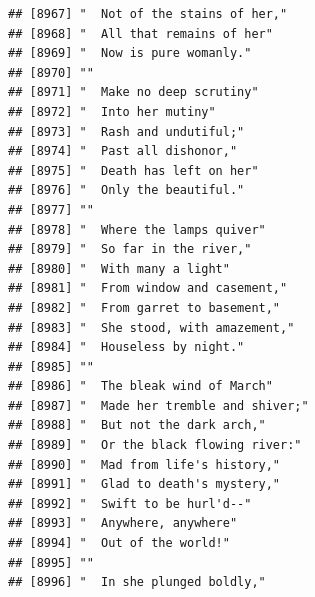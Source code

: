 \documentclass{article}\usepackage[]{graphicx}\usepackage[]{color}
\makeatletter
\newenvironment{kframe}{%
 \def\at@end@of@kframe{}%
 \ifinner\ifhmode%
  \def\at@end@of@kframe{\end{minipage}}%
  \begin{minipage}{\columnwidth}%
 \fi\fi%
 \def\FrameCommand##1{\hskip\@totalleftmargin \hskip-\fboxsep
 \colorbox{shadecolor}{##1}\hskip-\fboxsep
     \hskip-\linewidth \hskip-\@totalleftmargin \hskip\columnwidth}%
 \MakeFramed {\advance\hsize-\width
   \@totalleftmargin\z@ \linewidth\hsize
   \@setminipage}}%
 {\par\unskip\endMakeFramed%
 \at@end@of@kframe}
\newenvironment{knitrout}{}{} %
\makeatother
\begin{document}
\begin{knitrout}
\begin{kframe}
\begin{verbatim}
## [8967] "  Not of the stains of her,"                                                 
## [8968] "  All that remains of her"                                                   
## [8969] "  Now is pure womanly."                                                      
## [8970] ""                                                                            
## [8971] "  Make no deep scrutiny"                                                     
## [8972] "  Into her mutiny"                                                           
## [8973] "  Rash and undutiful;"                                                       
## [8974] "  Past all dishonor,"                                                        
## [8975] "  Death has left on her"                                                     
## [8976] "  Only the beautiful."                                                       
## [8977] ""                                                                            
## [8978] "  Where the lamps quiver"                                                    
## [8979] "  So far in the river,"                                                      
## [8980] "  With many a light"                                                         
## [8981] "  From window and casement,"                                                 
## [8982] "  From garret to basement,"                                                  
## [8983] "  She stood, with amazement,"                                                
## [8984] "  Houseless by night."                                                       
## [8985] ""                                                                            
## [8986] "  The bleak wind of March"                                                   
## [8987] "  Made her tremble and shiver;"                                              
## [8988] "  But not the dark arch,"                                                    
## [8989] "  Or the black flowing river:"                                               
## [8990] "  Mad from life's history,"                                                  
## [8991] "  Glad to death's mystery,"                                                  
## [8992] "  Swift to be hurl'd--"                                                      
## [8993] "  Anywhere, anywhere"                                                        
## [8994] "  Out of the world!"                                                         
## [8995] ""                                                                            
## [8996] "  In she plunged boldly,"                                                    

\end{verbatim}
\end{kframe}
\end{knitrout}
\end{document}
